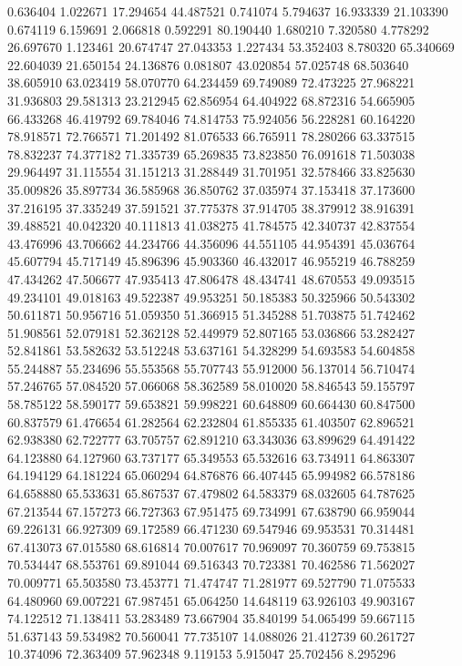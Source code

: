 0.636404
1.022671
17.294654
44.487521
0.741074
5.794637
16.933339
21.103390
0.674119
6.159691
2.066818
0.592291
80.190440
1.680210
7.320580
4.778292
26.697670
1.123461
20.674747
27.043353
1.227434
53.352403
8.780320
65.340669
22.604039
21.650154
24.136876
0.081807
43.020854
57.025748
68.503640
38.605910
63.023419
58.070770
64.234459
69.749089
72.473225
27.968221
31.936803
29.581313
23.212945
62.856954
64.404922
68.872316
54.665905
66.433268
46.419792
69.784046
74.814753
75.924056
56.228281
60.164220
78.918571
72.766571
71.201492
81.076533
66.765911
78.280266
63.337515
78.832237
74.377182
71.335739
65.269835
73.823850
76.091618
71.503038
29.964497
31.115554
31.151213
31.288449
31.701951
32.578466
33.825630
35.009826
35.897734
36.585968
36.850762
37.035974
37.153418
37.173600
37.216195
37.335249
37.591521
37.775378
37.914705
38.379912
38.916391
39.488521
40.042320
40.111813
41.038275
41.784575
42.340737
42.837554
43.476996
43.706662
44.234766
44.356096
44.551105
44.954391
45.036764
45.607794
45.717149
45.896396
45.903360
46.432017
46.955219
46.788259
47.434262
47.506677
47.935413
47.806478
48.434741
48.670553
49.093515
49.234101
49.018163
49.522387
49.953251
50.185383
50.325966
50.543302
50.611871
50.956716
51.059350
51.366915
51.345288
51.703875
51.742462
51.908561
52.079181
52.362128
52.449979
52.807165
53.036866
53.282427
52.841861
53.582632
53.512248
53.637161
54.328299
54.693583
54.604858
55.244887
55.234696
55.553568
55.707743
55.912000
56.137014
56.710474
57.246765
57.084520
57.066068
58.362589
58.010020
58.846543
59.155797
58.785122
58.590177
59.653821
59.998221
60.648809
60.664430
60.847500
60.837579
61.476654
61.282564
62.232804
61.855335
61.403507
62.896521
62.938380
62.722777
63.705757
62.891210
63.343036
63.899629
64.491422
64.123880
64.127960
63.737177
65.349553
65.532616
63.734911
64.863307
64.194129
64.181224
65.060294
64.876876
66.407445
65.994982
66.578186
64.658880
65.533631
65.867537
67.479802
64.583379
68.032605
64.787625
67.213544
67.157273
66.727363
67.951475
69.734991
67.638790
66.959044
69.226131
66.927309
69.172589
66.471230
69.547946
69.953531
70.314481
67.413073
67.015580
68.616814
70.007617
70.969097
70.360759
69.753815
70.534447
68.553761
69.891044
69.516343
70.723381
70.462586
71.562027
70.009771
65.503580
73.453771
71.474747
71.281977
69.527790
71.075533
64.480960
69.007221
67.987451
65.064250
14.648119
63.926103
49.903167
74.122512
71.138411
53.283489
73.667904
35.840199
54.065499
59.667115
51.637143
59.534982
70.560041
77.735107
14.088026
21.412739
60.261727
10.374096
72.363409
57.962348
9.119153
5.915047
25.702456
8.295296
